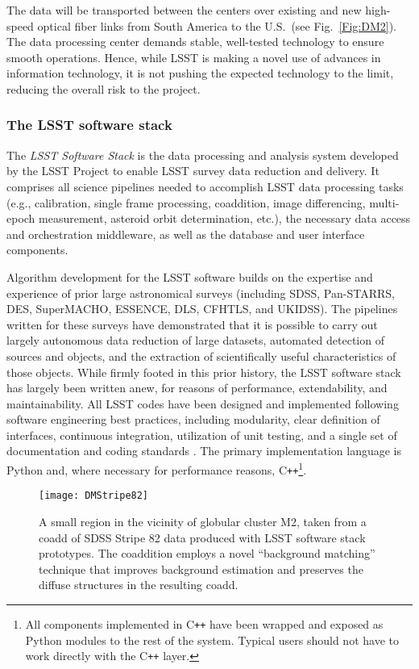 The data will be transported between the centers over existing and new high-speed optical fiber
links from South America to the U.S.\ (see Fig.~\ref{Fig:DM2}). The data processing center demands
stable, well-tested technology to ensure smooth operations. Hence, while LSST is making a novel
use of advances in information technology, it is not pushing the expected technology to the limit,
reducing the overall risk to the project.

\subsubsection{The LSST software stack}
\label{sec:dmstack}

The \emph{LSST Software Stack} is the data processing and analysis
system developed by the LSST Project to enable LSST survey data
reduction and delivery. It comprises
all science pipelines needed to accomplish LSST data processing tasks
(e.g., calibration, single frame processing, coaddition, image
differencing, multi-epoch measurement, asteroid orbit determination,
etc.), the necessary data
access and orchestration middleware, as well as the database and user
interface components.


Algorithm development for the LSST software builds on the expertise
and experience of prior large astronomical surveys (including SDSS,
Pan-STARRS, DES,
SuperMACHO, ESSENCE,  DLS, CFHTLS, and UKIDSS). The pipelines written
for these surveys have demonstrated that it is possible to carry out
largely autonomous data
reduction of large datasets, automated detection of sources and
objects, and the
extraction of scientifically useful characteristics of those objects.
While firmly footed in this prior history, the LSST software stack has
largely been written anew, for reasons of performance, extendability, and
maintainability. All LSST codes have been designed and implemented
following software engineering best practices, including modularity, clear definition
of interfaces, continuous integration,
utilization of unit testing, and a single set of documentation and coding
standards \citep{2018SPIE10707-10J}. The primary implementation language is Python and, where
necessary for performance reasons, C\texttt{++}\footnote{All components implemented
in C\texttt{++} have been wrapped and exposed as Python modules to the rest of the system.
Typical users should not have to work directly with the C\texttt{++} layer.}.

\begin{figure}
%
%
\texttt{[image: DMStripe82]}
\caption{
A small region in the vicinity of globular cluster M2, taken from a coadd of SDSS Stripe 82 data produced with LSST software stack prototypes. The coaddition employs a novel ``background matching'' technique that improves background estimation and preserves the diffuse structures in the resulting coadd.}
\label{Fig:DMStripe82}
\end{figure}



